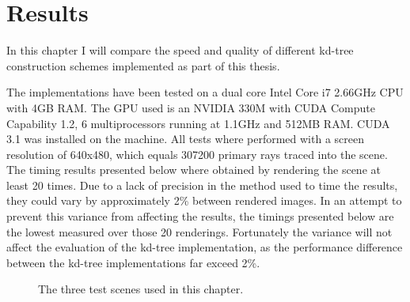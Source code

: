 
\chapter{Results}\label{chp:results}



In this chapter I will compare the speed and quality of different kd-tree
construction schemes implemented as part of this thesis.


The implementations have been tested on a dual core Intel Core i7 2.66GHz CPU
with 4GB RAM. The GPU used is an NVIDIA 330M with CUDA Compute Capability 1.2, 6
multiprocessors running at 1.1GHz and 512MB RAM. CUDA 3.1 was installed on the
machine. All tests where performed with a screen resolution of 640x480, which
equals 307200 primary rays traced into the scene. The timing results presented
below where obtained by rendering the scene at least 20 times. Due to a lack of
precision in the method used to time the results, they could vary by
approximately 2\% between rendered images. In an attempt to prevent this
variance from affecting the results, the timings presented below are the lowest
measured over those 20 renderings. Fortunately the variance will not affect the
evaluation of the kd-tree implementation, as the performance difference between
the kd-tree implementations far exceed 2\%.


\begin{figure}
  \centering
  \caption[Test scenes.]{The three test scenes used in this chapter.}
  \label{fig:testScenes}
\end{figure}


